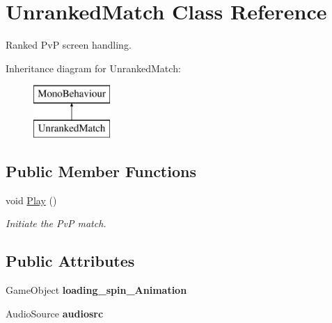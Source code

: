 \hypertarget{class_unranked_match}{}\section{Unranked\+Match Class Reference}
\label{class_unranked_match}


Ranked PvP screen handling.  


Inheritance diagram for Unranked\+Match\+:\begin{figure}[H]
\begin{center}
\leavevmode
\includegraphics[height=2.000000cm]{class_unranked_match}
\end{center}
\end{figure}
\subsection*{Public Member Functions}
\begin{DoxyCompactItemize}
\item 
\mbox{\label{class_unranked_match_afce2d9b096ad7e07913e6e574055083e}} 
void \mbox{\hyperlink{class_unranked_match_afce2d9b096ad7e07913e6e574055083e}{Play}} ()
\begin{DoxyCompactList}\small\item\em Initiate the PvP match. \end{DoxyCompactList}\end{DoxyCompactItemize}
\subsection*{Public Attributes}
\begin{DoxyCompactItemize}
\item 
\mbox{\label{class_unranked_match_acf7f9186ee313f3bc5cabb097eb41e37}} 
Game\+Object {\bfseries loading\+\_\+spin\+\_\+\+Animation}
\item 
\mbox{\label{class_unranked_match_a467346b77a8d2cbe87bdbdc6a99809b0}} 
Audio\+Source {\bfseries audiosrc}
\end{DoxyCompactItemize}
